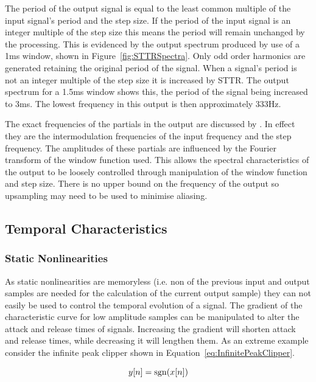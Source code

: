 			The period of the output signal is equal to the least common multiple of the input signal's period
			and the step size. If the period of the input signal is an integer multiple of the step size this
			means the period will remain unchanged by the processing. This is evidenced by the output spectrum
			produced by use of a 1ms window, shown in Figure~\ref{fig:STTRSpectra}. Only odd order harmonics
			are generated retaining the original period of the signal. When a signal's period is not an integer
			multiple of the step size it is increased by STTR. The output spectrum for a 1.5ms window shows
			this, the period of the signal being increased to 3ms. The lowest frequency in this output is then
			approximately 333Hz.

			The exact frequencies of the partials in the output are discussed by \citet{kim2014shorttime}. In
			effect they are the intermodulation frequencies of the input frequency and the step frequency. The
			amplitudes of these partials are influenced by the Fourier transform of the window function used.
			This allows the spectral characteristics of the output to be loosely controlled through
			manipulation of the window function and step size. There is no upper bound on the frequency of the
			output so upsampling may need to be used to minimise aliasing.

	\subsection{Temporal Characteristics}
	\label{sec:ExcitationEvaluation-Comparison-TemporalCharacteristics}
		\subsubsection*{Static Nonlinearities}
			As static nonlinearities are memoryless (i.e. non of the previous input and output samples are
			needed for the calculation of the current output sample) they can not easily be used to control the
			temporal evolution of a signal. The gradient of the characteristic curve for low amplitude samples
			can be manipulated to alter the attack and release times of signals. Increasing the gradient will
			shorten attack and release times, while decreasing it will lengthen them. As an extreme example
			consider the infinite peak clipper shown in Equation~\ref{eq:InfinitePeakClipper}.

			\begin{equation}
				y[n] = \operatorname{sgn}(x[n])
				\label{eq:InfinitePeakClipper}
			\end{equation}
			
